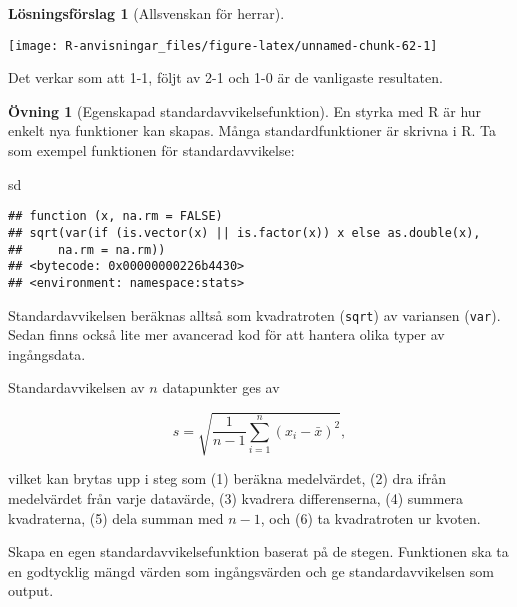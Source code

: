\documentclass[
]{book}
\newenvironment{Shaded}{\begin{snugshade}}{\end{snugshade}}
\newcommand{\NormalTok}[1]{#1}
\theoremstyle{definition}
\theoremstyle{definition}
\theoremstyle{definition}
\newtheorem{exercise}{Övning}[chapter]
\theoremstyle{definition}
\newtheorem{hypothesis}{Lösningsförslag}[chapter]
\theoremstyle{remark}
\begin{document}
\begin{hypothesis}[Allsvenskan för herrar]
\begin{center}\texttt{[image: R-anvisningar\_files/figure-latex/unnamed-chunk-62-1]} \end{center}

Det verkar som att 1-1, följt av 2-1 och 1-0 är de vanligaste resultaten.
\end{hypothesis}

\begin{exercise}[Egenskapad standardavvikelsefunktion]
En styrka med R är hur enkelt nya funktioner kan skapas. Många standardfunktioner är skrivna i R. Ta som exempel funktionen för standardavvikelse:

\begin{Shaded}
\begin{Highlighting}[]
\NormalTok{sd}
\end{Highlighting}
\end{Shaded}

\begin{verbatim}
## function (x, na.rm = FALSE) 
## sqrt(var(if (is.vector(x) || is.factor(x)) x else as.double(x), 
##     na.rm = na.rm))
## <bytecode: 0x00000000226b4430>
## <environment: namespace:stats>
\end{verbatim}

Standardavvikelsen beräknas alltså som kvadratroten (\texttt{sqrt}) av variansen (\texttt{var}). Sedan finns också lite mer avancerad kod för att hantera olika typer av ingångsdata.

Standardavvikelsen av \(n\) datapunkter ges av

\[s = \sqrt{\frac{1}{n-1}\sum_{i=1}^n (x_i - \bar x)^2},\]

vilket kan brytas upp i steg som (1) beräkna medelvärdet, (2) dra ifrån medelvärdet från varje datavärde, (3) kvadrera differenserna, (4) summera kvadraterna, (5) dela summan med \(n-1\), och (6) ta kvadratroten ur kvoten.

Skapa en egen standardavvikelsefunktion baserat på de stegen. Funktionen ska ta en godtycklig mängd värden som ingångsvärden och ge standardavvikelsen som output.
\end{exercise}
\end{document}
